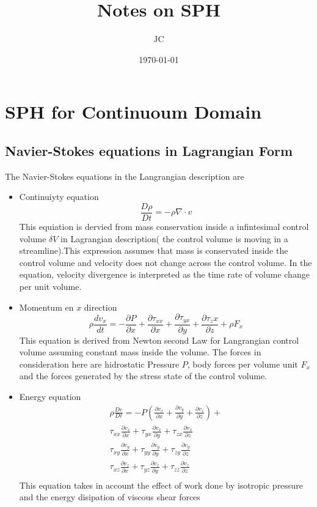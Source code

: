 \documentclass[10pt, twocolumn]{thesis}
\title{Notes on SPH}
\author{JC}
\date{\today}
\begin{document}
\maketitle
\tableofcontents
\part{SPH for Continuoum Domain}

\chapter{Navier-Stokes equations in Lagrangian Form} 
The Navier-Stokes equations in the Langrangian description are\cite{Liu_SPH}
\begin{itemize}
\item Continuiyty equation
\[\frac{D\rho}{Dt}=-\rho\nabla\cdot v\]
This equiation is dervied from mass conservation inside a infintesimal control volume $\delta V$ in Lagrangian description( the control volume is moving in a streamline).This expression assumes that mass is conservated inside the control volume and velocity does not change across the control volume. In the equation, velocity divergence is interpreted as the time rate of volume change per unit volume.
\item Momentum en $x$ direction
\[\rho\frac{dv_x}{dt}=-\frac{\partial P}{\partial x} + \frac{\partial \tau_{xx}}{\partial x} + \frac{\partial \tau_{yx}}{\partial y} + \frac{\partial \tau_{z}x}{\partial z} + \rho F_x\]
This equation is derived from Newton second Law for Langrangian control volume assuming constant mass inside the volume. The forces in consideration here are hidrostatic Pressure $P$, body forces per volume unit $F_x$ and the forces generated by the stress state of the control volume.
\item Energy equation\\
\begin{multline*}
\rho\frac{De}{Dt} = -P\left(\frac{\partial v_x}{\partial x} + \frac{\partial v_y}{\partial y} + \frac{\partial v_z}{\partial z}\right) + \\
\tau_{xx}\frac{\partial v_x}{\partial x} + \tau_{yx}\frac{\partial v_x}{\partial y} + \tau_{zx}\frac{\partial v_x}{\partial z} \\
\tau_{xy}\frac{\partial v_y}{\partial x} + \tau_{yy}\frac{\partial v_y}{\partial y} + \tau_{zy}\frac{\partial v_y}{\partial z} \\
\tau_{xz}\frac{\partial v_z}{\partial x} + \tau_{yz}\frac{\partial v_z}{\partial y} + \tau_{zz}\frac{\partial v_z}{\partial z}\\
\end{multline*}
This equation takes in account the effect of work done by isotropic pressure and the energy disipation of viscous shear forces\\
\end{itemize}
\end{document}
